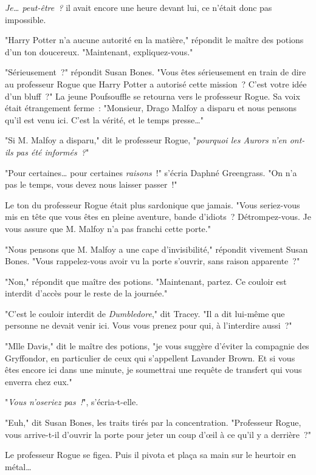 \emph{Je… peut-être~?} il avait encore une heure devant lui, ce n'était donc pas impossible.

"Harry Potter n'a aucune autorité en la matière," répondit le maître des potions d'un ton doucereux. "Maintenant, expliquez-vous."

"Sérieusement~?" répondit Susan Bones. "Vous êtes sérieusement en train de dire au professeur Rogue que Harry Potter a autorisé cette mission~? C'est votre idée d'un bluff~?" La jeune Poufsouffle se retourna vers le professeur Rogue. Sa voix était étrangement ferme~: "Monsieur, Drago Malfoy a disparu et nous pensons qu'il est venu ici. C'est la vérité, et le temps presse…"

"Si M. Malfoy a disparu," dit le professeur Rogue, "\emph{pourquoi les Aurors n'en ont-ils pas été informés~?}"

"Pour certaines… pour certaines \emph{raisons}~!" s'écria Daphné Greengrass. "On n'a pas le temps, vous devez nous laisser passer~!"

Le ton du professeur Rogue était plus sardonique que jamais. "Vous seriez-vous mis en tête que vous êtes en pleine aventure, bande d'idiots~? Détrompez-vous. Je vous assure que M. Malfoy n'a pas franchi cette porte."

"Nous pensons que M. Malfoy a une cape d'invisibilité," répondit vivement Susan Bones. "Vous rappelez-vous avoir vu la porte s'ouvrir, sans raison apparente~?"

"Non," répondit que maître des potions. "Maintenant, partez. Ce couloir est interdit d'accès pour le reste de la journée."

"C'est le couloir interdit de \emph{Dumbledore}," dit Tracey. "Il a dit lui-même que personne ne devait venir ici. Vous vous prenez pour qui, à l'interdire aussi~?"

"Mlle Davis," dit le maître des potions, "je vous suggère d'éviter la compagnie des Gryffondor, en particulier de ceux qui s'appellent Lavander Brown. Et si vous êtes encore ici dans une minute, je soumettrai une requête de transfert qui vous enverra chez eux."

"\emph{Vous n'oseriez pas~!}", s'écria-t-elle.

"Euh," dit Susan Bones, les traits tirés par la concentration. "Professeur Rogue, vous arrive-t-il d'ouvrir la porte pour jeter un coup d'œil à ce qu'il y a derrière~?"

Le professeur Rogue se figea. Puis il pivota et plaça sa main sur le heurtoir en métal…

